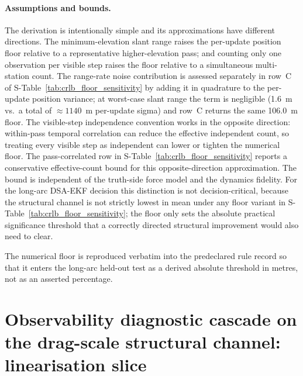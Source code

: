 \documentclass{article}
\begin{document}
\paragraph{Assumptions and bounds.}
The derivation is intentionally simple and its approximations have different directions. The minimum-elevation slant range raises the per-update position floor relative to a representative higher-elevation pass; and counting only one observation per visible step raises the floor relative to a simultaneous multi-station count. The range-rate noise contribution is assessed separately in row~C of S-Table~\ref{tab:crlb_floor_sensitivity} by adding it in quadrature to the per-update position variance; at worst-case slant range the term is negligible (1.6~m vs.\ a total of ${\approx}1140$~m per-update sigma) and row~C returns the same 106.0~m floor. The visible-step independence convention works in the opposite direction: within-pass temporal correlation can reduce the effective independent count, so treating every visible step as independent can lower or tighten the numerical floor. The pass-correlated row in S-Table~\ref{tab:crlb_floor_sensitivity} reports a conservative effective-count bound for this opposite-direction approximation. The bound is independent of the truth-side force model and the dynamics fidelity. For the long-arc DSA-EKF decision this distinction is not decision-critical, because the structural channel is not strictly lowest in mean under any floor variant in S-Table~\ref{tab:crlb_floor_sensitivity}; the floor only sets the absolute practical significance threshold that a correctly directed structural improvement would also need to clear.

The numerical floor is reproduced verbatim into the predeclared rule record so that it enters the long-arc held-out test as a derived absolute threshold in metres, not as an asserted percentage.

\section{Observability diagnostic cascade on the drag-scale structural channel: linearisation slice}
\label{app:constructive-positive-control}
\end{document}

